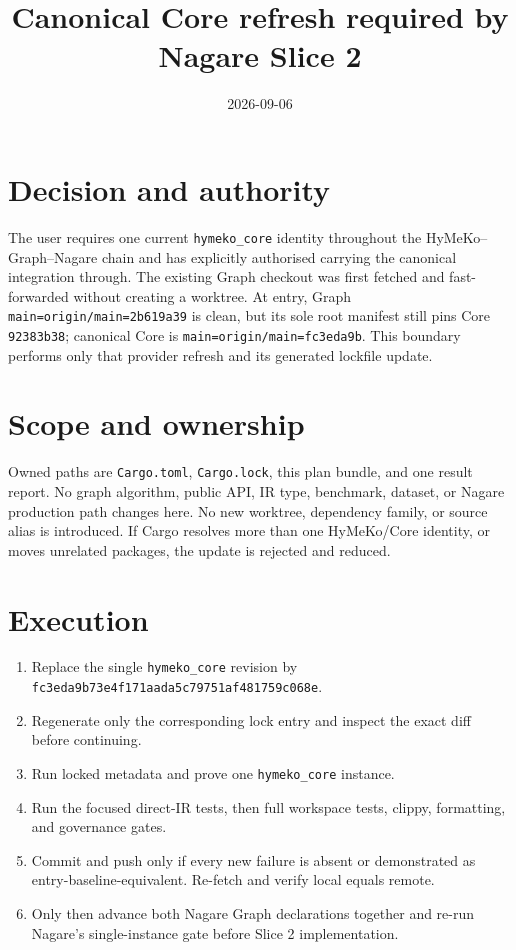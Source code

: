 \documentclass[11pt]{article}
\title{Canonical Core refresh required by Nagare Slice 2}
\date{2026-09-06}
\begin{document}
\maketitle

\section{Decision and authority}
The user requires one current \texttt{hymeko\_core} identity throughout the
HyMeKo--Graph--Nagare chain and has explicitly authorised carrying the canonical
integration through.  The existing Graph checkout was first fetched and
fast-forwarded without creating a worktree.  At entry, Graph
\texttt{main=origin/main=2b619a39} is clean, but its sole root manifest still
pins Core \texttt{92383b38}; canonical Core is
\texttt{main=origin/main=fc3eda9b}.  This boundary performs only that provider
refresh and its generated lockfile update.

\section{Scope and ownership}
Owned paths are \texttt{Cargo.toml}, \texttt{Cargo.lock}, this plan bundle, and
one result report.  No graph algorithm, public API, IR type, benchmark, dataset,
or Nagare production path changes here.  No new worktree, dependency family, or
source alias is introduced.  If Cargo resolves more than one HyMeKo/Core
identity, or moves unrelated packages, the update is rejected and reduced.

\section{Execution}
\begin{enumerate}
  \item Replace the single \texttt{hymeko\_core} revision by
        \texttt{fc3eda9b73e4f171aada5c79751af481759c068e}.
  \item Regenerate only the corresponding lock entry and inspect the exact
        diff before continuing.
  \item Run locked metadata and prove one \texttt{hymeko\_core} instance.
  \item Run the focused direct-IR tests, then full workspace tests, clippy,
        formatting, and governance gates.
  \item Commit and push only if every new failure is absent or demonstrated as
        entry-baseline-equivalent.  Re-fetch and verify local equals remote.
  \item Only then advance both Nagare Graph declarations together and re-run
        Nagare's single-instance gate before Slice 2 implementation.
\end{enumerate}
\end{document}
